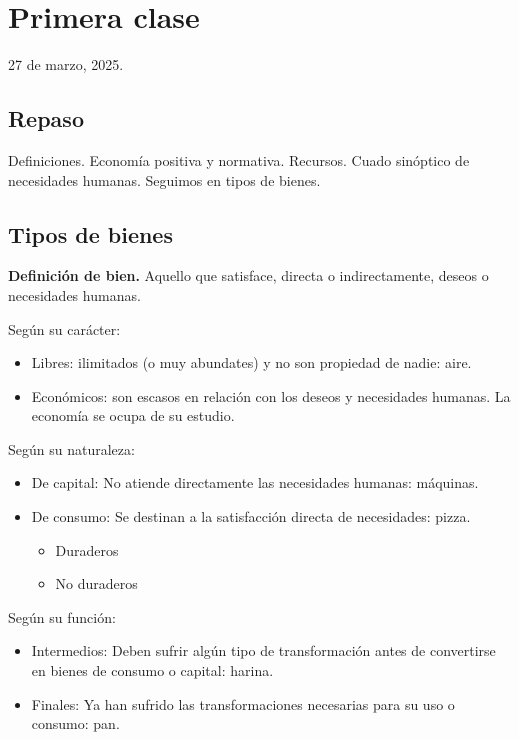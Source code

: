 \section{Primera clase}

27 de marzo, 2025.

\subsection{Repaso}

Definiciones. Economía positiva y normativa.
Recursos.
Cuado sinóptico de necesidades humanas.
Seguimos en tipos de bienes.

\subsection{Tipos de bienes}

\textbf{Definición de bien.}
Aquello que satisface, directa o indirectamente, deseos o necesidades humanas.

Según su carácter:
\begin{itemize}
    \item Libres: ilimitados (o muy abundates) y no son propiedad de nadie: aire.
    \item Económicos: son escasos en relación con los deseos y necesidades humanas.
    La economía se ocupa de su estudio.
\end{itemize}

Según su naturaleza:
\begin{itemize}
    \item De capital: 
    No atiende directamente las necesidades humanas:
    máquinas.
    \item De consumo:
    Se destinan a la satisfacción directa de necesidades:
    pizza.
    \begin{itemize}
        \item Duraderos
        \item No duraderos
    \end{itemize}
\end{itemize}

Según su función:
\begin{itemize}
    \item Intermedios:
    Deben sufrir algún tipo de transformación antes de convertirse en bienes de consumo o capital: harina.
    \item Finales:
    Ya han sufrido las transformaciones necesarias para su uso o consumo: pan.
\end{itemize}

